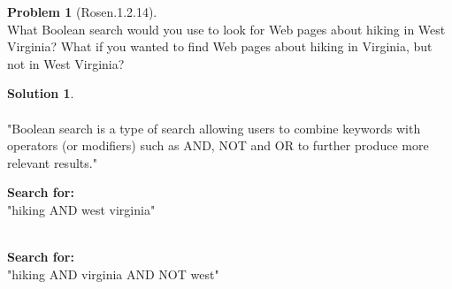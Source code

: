 \documentclass{article}
\theoremstyle{definition}
\newtheorem*{problem}{Problem}
\newtheorem*{solution}{Solution}
\begin{document}
\begin{problem}[Rosen.1.2.14]\ \\
What Boolean search would you use to look for Web
pages about hiking in West Virginia? What if you wanted
to find Web pages about hiking in Virginia, but not in West
Virginia?
\begin{compactenum}
\renewcommand{\theenumi}{\alph{enumi}}

\end{compactenum}
\end{problem}

\begin{solution}\ \\
\ \\
"Boolean search is a type of search allowing users to combine keywords with operators (or modifiers) such as AND, NOT and OR to further produce more relevant results."\ \\

\begin{compactenum}
\renewcommand{\theenumi}{\alph{enumi}}
\item
\textbf{Search for:}\ \\
"hiking AND west virginia"\ \\
\ \\
\item
\textbf{Search for:}\ \\
"hiking AND virginia AND NOT west"

\end{compactenum}
\end{solution}
\end{document}
